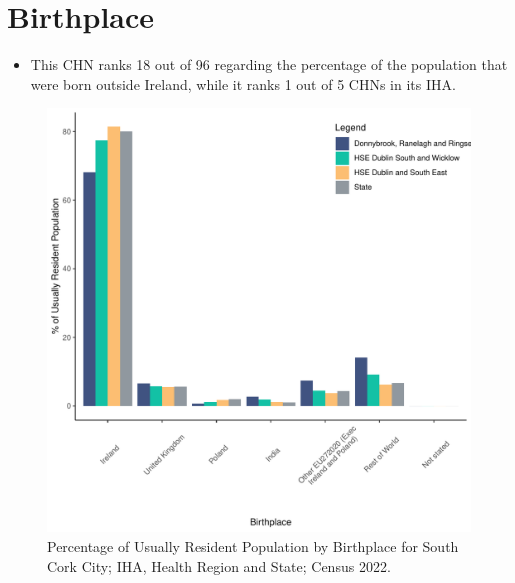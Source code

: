 \documentclass{article}
\begin{document}
\section{Birthplace}\label{sect:Birth}
\begin{itemize}
\item This CHN ranks  18 out of 96 regarding the percentage of the population that were born outside Ireland, while it ranks  1 out of 5 CHNs in its IHA.
\end{itemize}
\begin{figure}[H]
	\centering
	\includegraphics[width = 130mm]{../figures/BirthED.pdf}
	\caption{Percentage of Usually Resident Population by Birthplace for South Cork City; IHA, Health Region and State; Census 2022.}
	\label{fig:vbnv}
	\end{figure}
	
\end{document}
